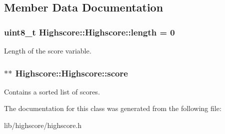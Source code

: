 \subsection{Member Data Documentation}
\hypertarget{class_highscore_1_1_highscore_a18a119eae9c24ab69477411b9bf45867}{
\subsubsection[{length}]{\setlength{\rightskip}{0pt plus 5cm}uint8\-\_\-t Highscore\-::\-Highscore\-::length = 0\hspace{0.3cm}{\ttfamily [private]}}}\label{class_highscore_1_1_highscore_a18a119eae9c24ab69477411b9bf45867}
Length of the score variable. \hypertarget{class_highscore_1_1_highscore_a569a403dc24a8fa67efd7065148f4c9d}{
\subsubsection[{score}]{$\ast$$\ast$ Highscore\-::\-Highscore\-::score\hspace{0.3cm}{\ttfamily [private]}}}\label{class_highscore_1_1_highscore_a569a403dc24a8fa67efd7065148f4c9d}
Contains a sorted list of scores. 

The documentation for this class was generated from the following file\-:\begin{DoxyCompactItemize}
\item 
lib/highscore/highscore.\-h\end{DoxyCompactItemize}

